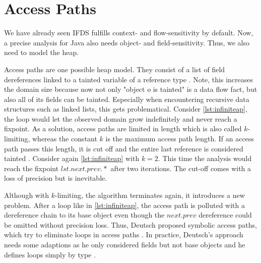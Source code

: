 \documentclass[../draft.tex]{subfiles}
\begin{document}
    \section{Access Paths}\label{s:ap}
    We have already seen IFDS fulfills context- and flow-sensitivity by default. Now, a precise analysis for Java also needs object- and field-sensitivity. Thus, we also need to model the heap. 

    Access paths are one possible heap model. They consist of a list of field dereferences linked to a tainted variable of a reference type \cite{Khedker2009}. Note, this increases the domain size because now not only "object $o$ is tainted" is a data flow fact, but also all of its fields can be tainted. Especially when encountering recursive data structures such as linked lists, this gets problematical. Consider \autoref{lst:infiniteap}, the loop would let the observed domain grow indefinitely and never reach a fixpoint.
    As a solution, access paths are limited in length which is also called $k$-limiting, whereas the constant $k$ is the maximum access path length. If an access path passes this length, it is cut off and the entire last reference is considered tainted \cite{Jones1979}. Consider again \autoref{lst:infiniteap} with $k=2$. This time the analysis would reach the fixpoint $lst.next.prev.*$ after two iterations.
    The cut-off comes with a loss of precision but is inevitable.

    Although with $k$-limiting, the algorithm terminates again, it introduces a new problem. After a loop like in \autoref{lst:infiniteap}, the access path is polluted with a dereference chain to its base object even though the $next.prev$ dereference could be omitted without precision loss. Thus, Deutsch proposed symbolic access paths, which try to eliminate loops in access paths \cite{Deutsch1994}. In practice, Deutsch's approach needs some adaptions as he only considered fields but not base objects and he defines loops simply by type \cite{Arzt2017PhD}. 
\end{document}

